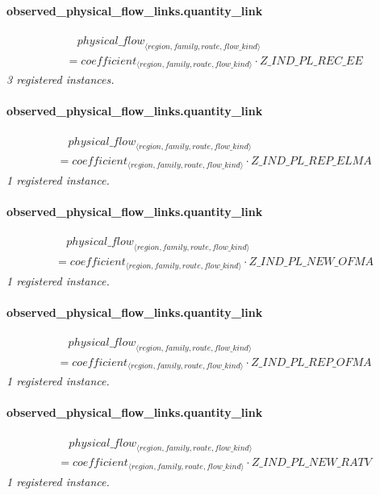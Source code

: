 \documentclass[11pt]{article}
\begin{document}
\paragraph{observed\_physical\_flow\_links.quantity\_link}
\begin{align*}
&\quad {physical\_flow}_{\langle region, family, route, flow\_kind\rangle}\\
&= coefficient_{\langle region, family, route, flow\_kind\rangle} \cdot Z\_IND\_PL\_REC\_EE
\end{align*}
\noindent\emph{3 registered instances.}\par
\paragraph{observed\_physical\_flow\_links.quantity\_link}
\begin{align*}
&\quad {physical\_flow}_{\langle region, family, route, flow\_kind\rangle}\\
&= coefficient_{\langle region, family, route, flow\_kind\rangle} \cdot Z\_IND\_PL\_REP\_ELMA
\end{align*}
\noindent\emph{1 registered instance.}\par
\paragraph{observed\_physical\_flow\_links.quantity\_link}
\begin{align*}
&\quad {physical\_flow}_{\langle region, family, route, flow\_kind\rangle}\\
&= coefficient_{\langle region, family, route, flow\_kind\rangle} \cdot Z\_IND\_PL\_NEW\_OFMA
\end{align*}
\noindent\emph{1 registered instance.}\par
\paragraph{observed\_physical\_flow\_links.quantity\_link}
\begin{align*}
&\quad {physical\_flow}_{\langle region, family, route, flow\_kind\rangle}\\
&= coefficient_{\langle region, family, route, flow\_kind\rangle} \cdot Z\_IND\_PL\_REP\_OFMA
\end{align*}
\noindent\emph{1 registered instance.}\par
\paragraph{observed\_physical\_flow\_links.quantity\_link}
\begin{align*}
&\quad {physical\_flow}_{\langle region, family, route, flow\_kind\rangle}\\
&= coefficient_{\langle region, family, route, flow\_kind\rangle} \cdot Z\_IND\_PL\_NEW\_RATV
\end{align*}
\noindent\emph{1 registered instance.}\par
\end{document}
